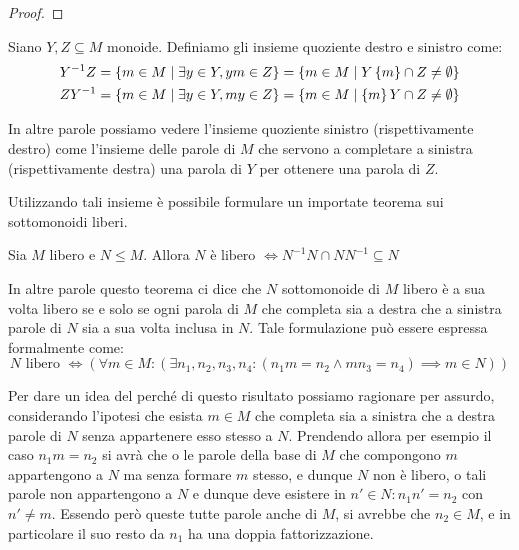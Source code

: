 \begin{proof}
\end{proof}

\begin{definition}
  Siano \(Y,Z \subseteq M\) monoide. Definiamo gli insieme quoziente destro e sinistro come:
  \begin{equation}
    \begin{aligned}
      Y^{-1}Z &= \set{m \in M}[ \exists y \in Y, ym \in Z] = \set{m \in M}[Y\set{m} \cap Z \neq \emptyset]\\
      ZY^{-1} &= \set{m \in M}[ \exists y \in Y, my \in Z] = \set{m \in M}[\set{m}Y \cap Z \neq \emptyset]
    \end{aligned}
  \end{equation}
\end{definition}

In altre parole possiamo vedere l'insieme quoziente sinistro (rispettivamente destro) come l'insieme delle parole di \(M\) che servono a completare a sinistra (rispettivamente destra) una parola di \(Y\) per ottenere una parola di \(Z\).

Utilizzando tali insieme è possibile formulare un importate teorema sui sottomonoidi liberi.

\begin{theorem}[Schuïtzenberger]\label{thm:schuïtzenberger}
  Sia \(M\) libero e \(N \leq M\). Allora \(N \text{ è libero } \iff N^{-1}N \cap NN^{-1} \subseteq N\)
\end{theorem}
In altre parole questo teorema ci dice che \(N\) sottomonoide di \(M\) libero è a sua volta libero se e solo se ogni parola di \(M\) che completa sia a destra che a sinistra parole di \(N\) sia a sua volta inclusa in \(N\).
Tale formulazione può essere espressa formalmente come:
\[N \text{ libero } \iff \left(\forall m \in M:(\exists n_1,n_2,n_3,n_4:( n_1m=n_2 \land mn_3=n_4) \implies m \in N)\right)\]

Per dare un idea del perché di questo risultato possiamo ragionare per assurdo, considerando l'ipotesi che esista \(m \in M\) che completa sia a sinistra che a destra parole di \(N\) senza appartenere esso stesso a \(N\).
Prendendo allora per esempio il caso \(n_1m=n_2\) si avrà che o le parole della base di \(M\) che compongono \(m\) appartengono a \(N\) ma senza formare \(m\) stesso, e dunque \(N\) non è libero, o tali parole non appartengono a \(N\) e dunque deve esistere in \(n' \in N: n_1n'=n_2\) con \(n' \neq m\).
Essendo però queste tutte parole anche di \(M\), si avrebbe che \(n_2 \in M\), e in particolare il suo resto da \(n_1\) ha una doppia fattorizzazione.

